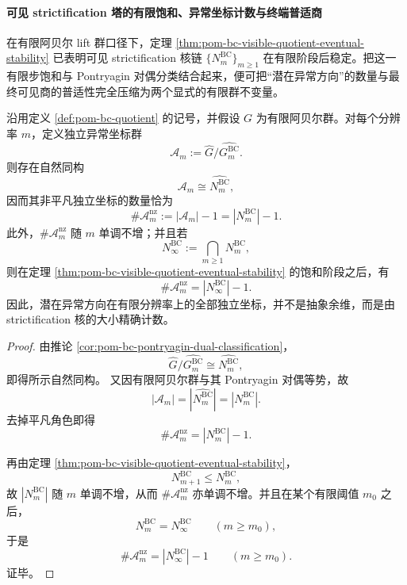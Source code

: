 \paragraph{可见 strictification 塔的有限饱和、异常坐标计数与终端普适商}
在有限阿贝尔 lift 群口径下，定理 \ref{thm:pom-bc-visible-quotient-eventual-stability} 已表明可见 strictification 核链 \(\{N_m^{\mathrm{BC}}\}_{m\ge 1}\) 在有限阶段后稳定。把这一有限步饱和与 Pontryagin 对偶分类结合起来，便可把“潜在异常方向”的数量与最终可见商的普适性完全压缩为两个显式的有限群不变量。

\begin{theorem}[独立异常坐标的精确计数律]\label{thm:xi-terminal-gbc-anomaly-coordinate-count}
沿用定义 \ref{def:pom-bc-quotient} 的记号，并假设 \(G\) 为有限阿贝尔群。对每个分辨率 \(m\)，定义独立异常坐标群
\[
\mathcal A_m:=\widehat G/\widehat{G_m^{\mathrm{BC}}}.
\]
则存在自然同构
\[
\mathcal A_m\cong \widehat{N_m^{\mathrm{BC}}},
\]
因而其非平凡独立坐标的数量恰为
\[
\#\mathcal A_m^{\mathrm{nz}}
:=
|\mathcal A_m|-1
=
|N_m^{\mathrm{BC}}|-1.
\]
此外，\(\#\mathcal A_m^{\mathrm{nz}}\) 随 \(m\) 单调不增；并且若
\[
N_\infty^{\mathrm{BC}}
:=
\bigcap_{m\ge 1}N_m^{\mathrm{BC}},
\]
则在定理 \ref{thm:pom-bc-visible-quotient-eventual-stability} 的饱和阶段之后，有
\[
\#\mathcal A_m^{\mathrm{nz}}=|N_\infty^{\mathrm{BC}}|-1.
\]
因此，潜在异常方向在有限分辨率上的全部独立坐标，并不是抽象余维，而是由 strictification 核的大小精确计数。
\end{theorem}

\begin{proof}
由推论 \ref{cor:pom-bc-pontryagin-dual-classification}，
\[
\widehat G/\widehat{G_m^{\mathrm{BC}}}
\cong
\widehat{N_m^{\mathrm{BC}}},
\]
即得所示自然同构。
又因有限阿贝尔群与其 Pontryagin 对偶等势，故
\[
|\mathcal A_m|
=
|\widehat{N_m^{\mathrm{BC}}}|
=
|N_m^{\mathrm{BC}}|.
\]
去掉平凡角色即得
\[
\#\mathcal A_m^{\mathrm{nz}}=|N_m^{\mathrm{BC}}|-1.
\]

再由定理 \ref{thm:pom-bc-visible-quotient-eventual-stability}，
\[
N_{m+1}^{\mathrm{BC}}\le N_m^{\mathrm{BC}},
\]
故 \(|N_m^{\mathrm{BC}}|\) 随 \(m\) 单调不增，从而 \(\#\mathcal A_m^{\mathrm{nz}}\) 亦单调不增。并且在某个有限阈值 \(m_0\) 之后，
\[
N_m^{\mathrm{BC}}=N_\infty^{\mathrm{BC}}\qquad(m\ge m_0),
\]
于是
\[
\#\mathcal A_m^{\mathrm{nz}}=|N_\infty^{\mathrm{BC}}|-1
\qquad(m\ge m_0).
\]
证毕。
\end{proof}

